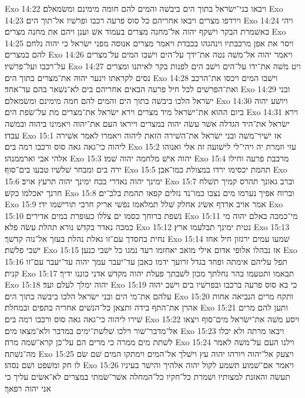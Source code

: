 Exo 14:22  ויבאו בני־ישׂראל בתוך הים ביבשׁה והמים להם חומה מימינם ומשׂמאלם׃
Exo 14:23  וירדפו מצרים ויבאו אחריהם כל סוס פרעה רכבו ופרשׁיו אל־תוך הים׃
Exo 14:24  ויהי באשׁמרת הבקר וישׁקף יהוה אל־מחנה מצרים בעמוד אשׁ וענן ויהם את מחנה מצרים׃
Exo 14:25  ויסר את אפן מרכבתיו וינהגהו בכבדת ויאמר מצרים אנוסה מפני ישׂראל כי יהוה נלחם להם במצרים׃
Exo 14:26  ויאמר יהוה אל־משׁה נטה את־ידך על־הים וישׁבו המים על־מצרים על־רכבו ועל־פרשׁיו׃
Exo 14:27  ויט משׁה את־ידו על־הים וישׁב הים לפנות בקר לאיתנו ומצרים נסים לקראתו וינער יהוה את־מצרים בתוך הים׃
Exo 14:28  וישׁבו המים ויכסו את־הרכב ואת־הפרשׁים לכל חיל פרעה הבאים אחריהם בים לא־נשׁאר בהם עד־אחד׃
Exo 14:29  ובני ישׂראל הלכו ביבשׁה בתוך הים והמים להם חמה מימינם ומשׂמאלם׃
Exo 14:30  ויושׁע יהוה ביום ההוא את־ישׂראל מיד מצרים וירא ישׂראל את־מצרים מת על־שׂפת הים׃
Exo 14:31  וירא ישׂראל את־היד הגדלה אשׁר עשׂה יהוה במצרים וייראו העם את־יהוה ויאמינו ביהוה ובמשׁה עבדו׃
Exo 15:1  אז ישׁיר־משׁה ובני ישׂראל את־השׁירה הזאת ליהוה ויאמרו לאמר אשׁירה ליהוה כי־גאה גאה סוס ורכבו רמה בים׃
Exo 15:2  עזי וזמרת יה ויהי־לי לישׁועה זה אלי ואנוהו אלהי אבי וארממנהו׃
Exo 15:3  יהוה אישׁ מלחמה יהוה שׁמו׃
Exo 15:4  מרכבת פרעה וחילו ירה בים ומבחר שׁלשׁיו טבעו בים־סוף׃
Exo 15:5  תהמת יכסימו ירדו במצולת כמו־אבן׃
Exo 15:6  ימינך יהוה נאדרי בכח ימינך יהוה תרעץ אויב׃
Exo 15:7  וברב גאונך תהרס קמיך תשׁלח חרנך יאכלמו כקשׁ׃
Exo 15:8  וברוח אפיך נערמו מים נצבו כמו־נד נזלים קפאו תהמת בלב־ים׃
Exo 15:9  אמר אויב ארדף אשׂיג אחלק שׁלל תמלאמו נפשׁי אריק חרבי תורישׁמו ידי׃
Exo 15:10  נשׁפת ברוחך כסמו ים צללו כעופרת במים אדירים׃
Exo 15:11  מי־כמכה באלם יהוה מי כמכה נאדר בקדשׁ נורא תהלת עשׂה פלא׃
Exo 15:12  נטית ימינך תבלעמו ארץ׃
Exo 15:13  נחית בחסדך עם־זו גאלת נהלת בעזך אל־נוה קדשׁך׃
Exo 15:14  שׁמעו עמים ירגזון חיל אחז ישׁבי פלשׁת׃
Exo 15:15  אז נבהלו אלופי אדום אילי מואב יאחזמו רעד נמגו כל ישׁבי כנען׃
Exo 15:16  תפל עליהם אימתה ופחד בגדל זרועך ידמו כאבן עד־יעבר עמך יהוה עד־יעבר עם־זו קנית׃
Exo 15:17  תבאמו ותטעמו בהר נחלתך מכון לשׁבתך פעלת יהוה מקדשׁ אדני כוננו ידיך׃
Exo 15:18  יהוה ימלך לעלם ועד׃
Exo 15:19  כי בא סוס פרעה ברכבו ובפרשׁיו בים וישׁב יהוה עלהם את־מי הים ובני ישׂראל הלכו ביבשׁה בתוך הים׃
Exo 15:20  ותקח מרים הנביאה אחות אהרן את־התף בידה ותצאן כל־הנשׁים אחריה בתפים ובמחלת׃
Exo 15:21  ותען להם מרים שׁירו ליהוה כי־גאה גאה סוס ורכבו רמה בים׃
Exo 15:22  ויסע משׁה את־ישׂראל מים־סוף ויצאו אל־מדבר־שׁור וילכו שׁלשׁת־ימים במדבר ולא־מצאו מים׃
Exo 15:23  ויבאו מרתה ולא יכלו לשׁתת מים ממרה כי מרים הם על־כן קרא־שׁמה מרה׃
Exo 15:24  וילנו העם על־משׁה לאמר מה־נשׁתה׃
Exo 15:25  ויצעק אל־יהוה ויורהו יהוה עץ וישׁלך אל־המים וימתקו המים שׁם שׂם לו חק ומשׁפט ושׁם נסהו׃
Exo 15:26  ויאמר אם־שׁמוע תשׁמע לקול יהוה אלהיך והישׁר בעיניו תעשׂה והאזנת למצותיו ושׁמרת כל־חקיו כל־המחלה אשׁר־שׂמתי במצרים לא־אשׂים עליך כי אני יהוה רפאך׃
